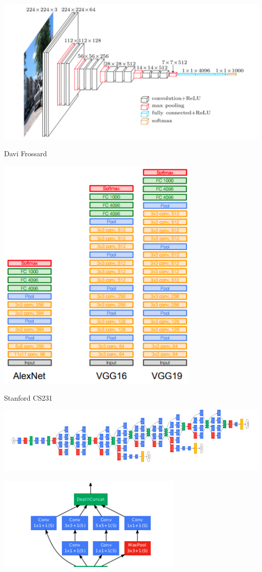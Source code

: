 {\centerline{\includegraphics[width = 9.0in]{../images/VGG}}
\centerline{\large Davi Frossard}

\centerline{\includegraphics[height=4.5in]{../images/VGGStack}}
\centerline{\large Stanford CS231}


\centerline{\includegraphics[width = 9.0in]{../images/inception1}}
\vfill
\centerline{\includegraphics[width = 3.5in]{../images/inception2}}

}
